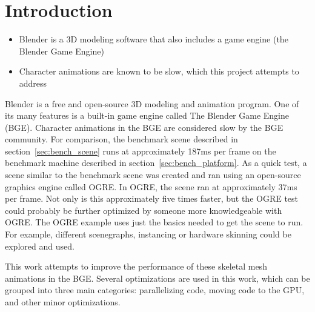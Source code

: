\section{Introduction}
\ifsummaries
\begin{itemize}
 \item Blender is a 3D modeling software that also includes a game engine (the Blender Game Engine)
 \item Character animations are known to be slow, which this project attempts to address
\end{itemize}
\fi

Blender is a free and open-source 3D modeling and animation program\cite{blender}.
One of its many features is a built-in game engine called The Blender Game Engine (BGE).
Character animations in the BGE are considered slow by the BGE community.
For comparison, the benchmark scene described in section~\ref{sec:bench_scene} runs at approximately 187ms per frame on the benchmark machine described in section~\ref{sec:bench_platform}.
As a quick test, a scene similar to the benchmark scene was created and ran using an open-source graphics engine called OGRE\cite{ogre}.
In OGRE, the scene ran at approximately 37ms per frame.
Not only is this approximately five times faster, but the OGRE test could probably be further optimized by someone more knowledgeable with OGRE.
The OGRE example uses just the basics needed to get the scene to run.
For example, different scenegraphs, instancing or hardware skinning could be explored and used.

This work attempts to improve the performance of these skeletal mesh animations in the BGE.
Several optimizations are used in this work, which can be grouped into three main categories: parallelizing code, moving code to the GPU, and other minor optimizations.
